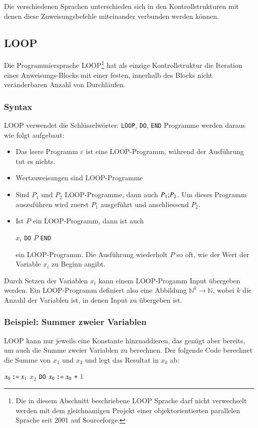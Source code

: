 Die verschiedenen Sprachen unterschieden sich in den Kontrollstrukturen
mit denen diese Zuweisungsbefehle miteinander verbunden werden können.

\subsection{LOOP}
%
Die Programmiersprache
LOOP\footnote{Die in diesem Abschnitt beschriebene
LOOP Sprache darf nicht verwechselt werden mit dem gleichnamigen
Projekt einer objektorientierten parallelen Sprache seit
2001 auf Sourceforge.}
hat als einzige Kontrollstruktur die
Iteration eines Anweisungs-Blocks mit einer festen, innerhalb des
Blocks nicht veränderbaren Anzahl von Durchläufen.

\subsubsection{Syntax}
LOOP verwendet die 
Schlüsselwörter: {\tt LOOP}, {\tt DO}, {\tt END}
Programme werden daraus wie folgt aufgebaut:
\begin{itemize}
\item Das leere Programm $\varepsilon$ ist eine LOOP-Programm,
während der Ausführung tut es nichts.
\item Wertzuweisungen sind LOOP-Programme
\item Sind $P_1$ und $P_2$ LOOP-Programme, dann auch
$P_1{\tt ;}P_2$. Um dieses Programm auszuführen wird zuerst $P_1$
ausgeführt und anschliessend $P_2$.
\item Ist $P$ ein LOOP-Programm, dann ist auch
\begin{algorithmic}
 $x_i$ {\tt DO} $P$ {\tt END}
\end{algorithmic}
ein LOOP-Programm. Die Ausführung wiederholt $P$ so oft, wie der
Wert der Variable $x_i$  zu Beginn angibt.
\end{itemize}
Durch Setzen der Variablen $x_i$ kann einem LOOP-Progamm Input übergeben
werden.
Ein LOOP-Programm definiert also eine Abbildung $\mathbb N^k\to\mathbb N$,
wobei $k$ die Anzahl der Variablen ist, in denen Input zu übergeben ist.

\subsubsection{Beispiel: Summer zweier Variablen}
LOOP kann nur jeweils eine Konstante hinzuaddieren, das genügt aber
bereits, um auch die Summe zweier Variablen zu berechnen. Der folgende
Code berechnet die Summe von $x_1$ und $x_2$ und legt das Resultat in
$x_0$ ab:
\begin{algorithmic}
\STATE $x_0 \mathbin{\texttt{:=}} x_1$
 $x_2$ {\tt DO}
\STATE{\tt \ \ \ \ }$x_0 \mathbin{\texttt{:=}} x_0$ {\tt +} $1$
\end{algorithmic}

